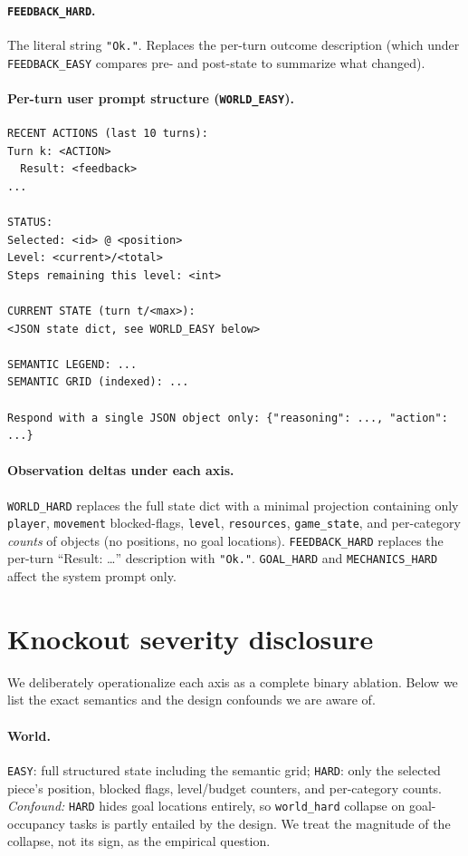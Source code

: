 \documentclass{article}
\begin{document}
\paragraph{\texttt{FEEDBACK\_HARD}.}
The literal string \texttt{"Ok."}. Replaces the per-turn outcome description (which under \texttt{FEEDBACK\_EASY} compares pre- and post-state to summarize what changed).

\paragraph{Per-turn user prompt structure (\texttt{WORLD\_EASY}).}
\begin{verbatim}
RECENT ACTIONS (last 10 turns):
Turn k: <ACTION>
  Result: <feedback>
...

STATUS:
Selected: <id> @ <position>
Level: <current>/<total>
Steps remaining this level: <int>

CURRENT STATE (turn t/<max>):
<JSON state dict, see WORLD_EASY below>

SEMANTIC LEGEND: ...
SEMANTIC GRID (indexed): ...

Respond with a single JSON object only: {"reasoning": ..., "action": ...}
\end{verbatim}

\paragraph{Observation deltas under each axis.}
\texttt{WORLD\_HARD} replaces the full state dict with a minimal projection containing only \texttt{player}, \texttt{movement} blocked-flags, \texttt{level}, \texttt{resources}, \texttt{game\_state}, and per-category \emph{counts} of objects (no positions, no goal locations). \texttt{FEEDBACK\_HARD} replaces the per-turn ``Result: \dots'' description with \texttt{"Ok."}. \texttt{GOAL\_HARD} and \texttt{MECHANICS\_HARD} affect the system prompt only.

\section{Knockout severity disclosure}
\label{app:severity}
We deliberately operationalize each axis as a complete binary ablation. Below we list the exact semantics and the design confounds we are aware of.

\paragraph{World.}
\texttt{EASY}: full structured state including the semantic grid; \texttt{HARD}: only the selected piece's position, blocked flags, level/budget counters, and per-category counts. \emph{Confound:} \texttt{HARD} hides goal locations entirely, so \texttt{world\_hard} collapse on goal-occupancy tasks is partly entailed by the design. We treat the magnitude of the collapse, not its sign, as the empirical question.
\end{document}
